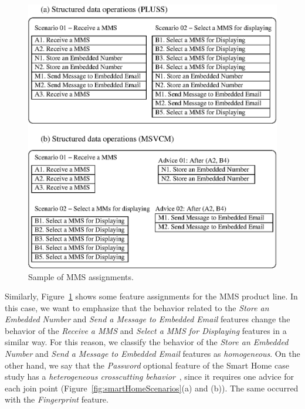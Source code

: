 \documentclass{sig-alt-full}
\begin{document}
\begin{figure}[tbh]
 \begin{center}
  \includegraphics[scale=0.62]{img/comparisonScenarios2.eps}
  \caption{Sample of MMS assignments.}
  \label{fig:MMSScenarios}
  \end{center}
\end{figure}

Similarly, Figure~\ref{fig:MMSScenarios} shows some feature assignments for the
MMS product line. In this case, we want to emphasize that the behavior related to
the \emph{Store an Embedded Number} and \emph{Send a Message to Embedded Email} 
features change the behavior of the \emph{Receive a MMS} and \emph{Select a
MMS for Displaying} features in a similar way. For this reason, we
classify the behavior of the \emph{Store an Embedded Number} and \emph{Send
a Message to Embedded Email} features as \emph{homogeneous}. On the other hand,
we say that the \emph{Password} optional feature of the Smart Home case study has a
\emph{heterogeneous crosscutting behavior}~\cite{Apel:2006aa}, since it requires one advice for each join point (Figure~\ref{fig:smartHomeScenarios}(a) and (b)). The same occurred with the \emph{Fingerprint} feature.
\end{document}
